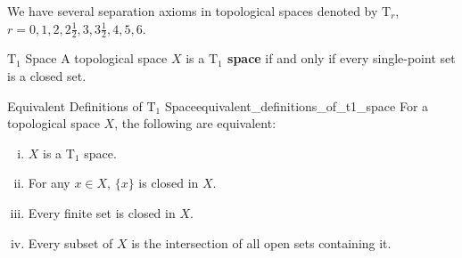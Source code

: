 \documentclass{report}
\begin{document}
We have several separation axioms in topological spaces denoted by $\mathrm{T}_r$, $r=0,1,2,2\frac{1}{2},3,3\frac{1}{2},4,5,6$.

\begin{definition}{$\mathrm{T}_1$ Space}{}
	A topological space $X$ is a \textbf{$\mathrm{T}_1$ space} if and only if every single-point set is a closed set.
\end{definition}

\begin{proposition}{Equivalent Definitions of $\mathrm{T}_1$ Space}{equivalent_definitions_of_t1_space}
	For a topological space $X$, the following are equivalent:
	\begin{enumerate}[(i)]
		\item $X$ is a $\mathrm{T}_1$ space.
		\item For any $x\in X$, $\{x\}$ is closed in $X$.
		\item Every finite set is closed in $X$.
		\item Every subset of $X$ is the intersection of all open sets containing it.
	\end{enumerate}
\end{proposition}
\end{document}
